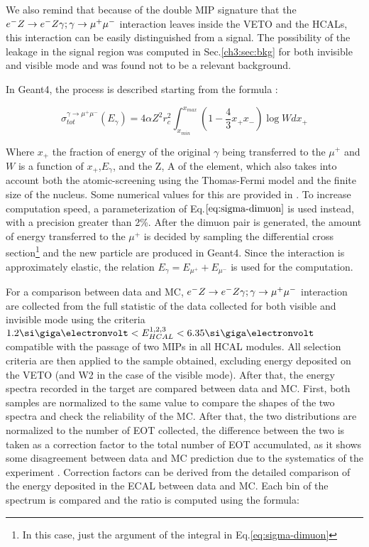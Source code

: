 We also remind that because of the double MIP signature that the $e^- Z \to e^- Z \gamma; \gamma \to \mu^+ \mu^-$ interaction leaves inside the VETO and the HCALs, this interaction can be easily distinguished from a signal. The possibility of the leakage in the signal region was computed in Sec.\ref{ch3:sec:bkg} for both invisible and visible mode and was found not to be a relevant background.

In Geant4, the process is described starting from the formula \cite{dimuon-mc}:

\begin{equation}
  \label{eq:sigma-dimuon}
  \sigma_{tot}^{\gamma \to \mu^+ \mu^-}(E_{\gamma}) = 4\alpha Z^2 r^2_c\int^{x_{max}}_{x_{min}} \left(1 - \frac{4}{3}x_+x_- \right) \log{W}dx_+
\end{equation}

Where $x_+$ the fraction of energy of the original $\gamma$ being transferred to the $\mu^+$ and $W$ is a function of $x_+$,$E_{\gamma}$, and the Z, A of the element, which also takes into account both the atomic-screening using the Thomas-Fermi model and the finite size of the nucleus. Some numerical values for this are provided in \cite{dimuon-mc}. To increase computation speed, a parameterization of Eq.$\ref{eq:sigma-dimuon}$ is used instead, with a precision greater than 2\%. After the dimuon pair is generated, the amount of energy transferred to the $\mu^+$ is decided by sampling the differential cross section\footnote{In this case, just the argument of the integral in Eq.\ref{eq:sigma-dimuon}} and the new particle are produced in Geant4. Since the interaction is approximately elastic, the relation $E_{\gamma} = E_{\mu^+} + E_{\mu^-}$ is used for the computation.

For a comparison between data and MC, $e^- Z \to e^- Z \gamma; \gamma \to \mu^+ \mu^-$ interaction are collected from the full statistic of the data collected for both visible and invisible mode using the criteria $1.2 \gev < E_{HCAL}^{1,2,3} < 6.35 \gev$ compatible with the passage of two MIPs in all HCAL modules. All selection criteria are then applied to the sample obtained, excluding energy deposited on the VETO (and W2 in the case of the visible mode). After that, the energy spectra recorded in the target are compared between data and MC. First, both samples are normalized to the same value to compare the shapes of the two spectra and check the reliability of the MC. After that, the two distributions are normalized to the number of EOT collected, the difference between the two is taken as a correction factor to the total number of EOT accumulated, as it shows some disagreement between data and MC prediction due to the systematics of the experiment \cite{na64-prd}. Correction factors can be derived from the detailed comparison of the energy deposited in the ECAL between data and MC. Each bin of the spectrum is compared and the ratio is computed using the formula:

